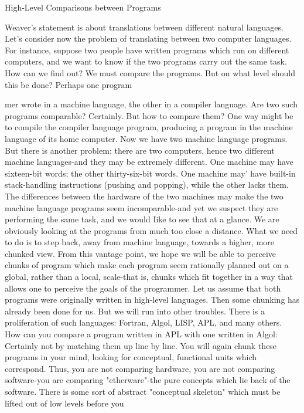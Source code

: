 High-Level Comparisons between Programs

Weaver's statement is about translations between different natural languages. Let's
consider now the problem of translating between two computer languages. For instance,
suppose two people have written programs which run on different computers, and we
want to know if the two programs carry out the same task. How can we find out? We
must compare the programs. But on what level should this be done? Perhaps one program





mer wrote in a machine language, the other in a compiler language. Are two such
programs comparable? Certainly. But how to compare them? One way might be to
compile the compiler language program, producing a program in the machine language of
its home computer.
        Now we have two machine language programs. But there is another problem:
there are two computers, hence two different machine languages-and they may be
extremely different. One machine may have sixteen-bit words; the other thirty-six-bit
words. One machine may' have built-in stack-handling instructions (pushing and
popping), while the other lacks them. The differences between the hardware of the two
machines may make the two machine language programs seem incomparable-and yet we
suspect they are performing the same task, and we would Iike to see that at a glance. We
are obviously looking at the programs from much too close a distance.
        What we need to do is to step back, away from machine language, towards a
higher, more chunked view. From this vantage point, we hope we will be able to perceive
chunks of program which make each program seem rationally planned out on a global,
rather than a local, scale-that is, chunks which fit together in a way that allows one to
perceive the goals of the programmer. Let us assume that both programs were originally
written in high-level languages. Then some chunking has already been done for us. But
we will run into other troubles. There is a proliferation of such languages: Fortran, Algol,
LISP, APL, and many others. How can you compare a program written in APL with one
written in Algol: Certainly not by matching them up line by line. You will again chunk
these programs in your mind, looking for conceptual, functional units which correspond.
Thus, you are not comparing hardware, you are not comparing software-you are
comparing "etherware"-the pure concepts which lie back of the software. There is some
sort of abstract "conceptual skeleton" which must be lifted out of low levels before you
